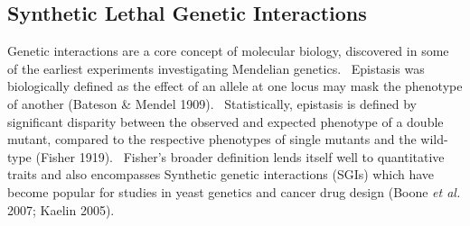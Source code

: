 

\subsection{Synthetic Lethal Genetic Interactions}
Genetic interactions are a core concept of molecular biology, discovered in some of the earliest experiments investigating Mendelian genetics. \ Epistasis was biologically defined as the effect of an allele at one locus may mask the phenotype of another (Bateson \& Mendel 1909). \ Statistically, epistasis is defined by significant disparity between the observed and expected phenotype of a double mutant, compared to the respective phenotypes of single mutants and the wild-type (Fisher 1919). \ Fisher{\textquoteright}s broader definition lends itself well to quantitative traits and also encompasses Synthetic genetic interactions (SGIs) which have become popular for studies in yeast genetics and cancer drug design (Boone\textit{ et al.} 2007; Kaelin 2005). \ 


